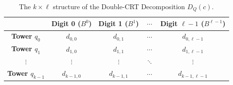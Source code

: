 
\begin{table}[h]
\centering
\renewcommand{\arraystretch}{1.5}
\begin{tabular}{c|cccc}
    & \textbf{Digit 0} ($B^0$) & \textbf{Digit 1} ($B^1$) & $\cdots$ & \textbf{Digit $\ell-1$} ($B^{\ell-1}$) \\
    \hline
    \textbf{Tower $q_0$} & $d_{0,0}$ & $d_{0,1}$ & $\cdots$ & $d_{0,\ell-1}$ \\
    \textbf{Tower $q_1$} & $d_{1,0}$ & $d_{1,1}$ & $\cdots$ & $d_{1,\ell-1}$ \\
    $\vdots$ & $\vdots$ & $\vdots$ & $\ddots$ & $\vdots$ \\
    \textbf{Tower $q_{k-1}$} & $d_{k-1,0}$ & $d_{k-1,1}$ & $\cdots$ & $d_{k-1,\ell-1}$ \\
\end{tabular}
\caption{The $k \times \ell$ structure of the Double-CRT Decomposition $D_Q(c)$.}
\end{table}

\newpage

